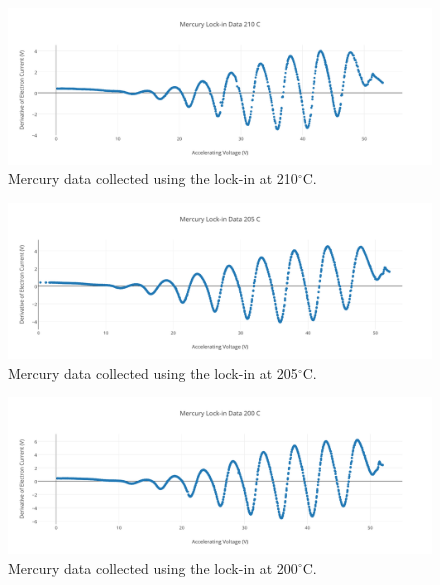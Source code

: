 \documentclass[prb,preprint]{revtex4-1}
\begin{document}
\begin{figure}[h!]
\centering

\includegraphics[width=6in]{lockin_210.pdf}
\caption{Mercury data collected using the lock-in at 210$^{\circ}$C.}

\label{lockin_210}
\end{figure}

\begin{figure}[h!]
\centering

\includegraphics[width=6in]{lockin_205.pdf}
\caption{Mercury data collected using the lock-in at 205$^{\circ}$C.}

\label{lockin_205}
\end{figure}

\begin{figure}[h!]
\centering

\includegraphics[width=6in]{lockin_200.pdf}
\caption{Mercury data collected using the lock-in at 200$^{\circ}$C.}

\label{lockin_200}
\end{figure}
\end{document}
